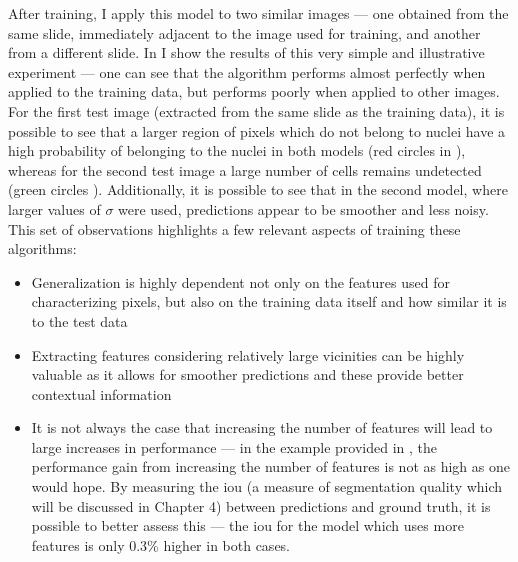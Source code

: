 After training, I apply this model to two similar images --- one obtained from the same slide, immediately adjacent to the image used for training, and another from a different slide. In  I show the results of this very simple and illustrative experiment --- one can see that the algorithm performs almost perfectly when applied to the training data, but performs poorly when applied to other images. For the first test image (extracted from the same slide as the training data), it is possible to see that a larger region of pixels which do not belong to nuclei have a high probability of belonging to the nuclei in both models (red circles in ), whereas for the second test image a large number of cells remains undetected (green circles ). Additionally, it is possible to see that in the second model, where larger values of $\sigma$ were used, predictions appear to be smoother and less noisy. This set of observations highlights a few relevant aspects of training these algorithms:

\begin{itemize}
    \item Generalization is highly dependent not only on the features used for characterizing pixels, but also on the training data itself and how similar it is to the test data
    \item Extracting features considering relatively large vicinities can be highly valuable as it allows for smoother predictions and these provide better contextual information
    \item It is not always the case that increasing the number of features will lead to large increases in performance --- in the example provided in , the performance gain from increasing the number of features is not as high as one would hope. By measuring the \ac{iou} (a measure of segmentation quality which will be discussed in Chapter 4) between predictions and ground truth, it is possible to better assess this --- the \ac{iou} for the model which uses more features is only 0.3\% higher in both cases.
\end{itemize}

\begin{figure}[!ht]
	\label{fig:segmentation-example-result}
\end{figure}

